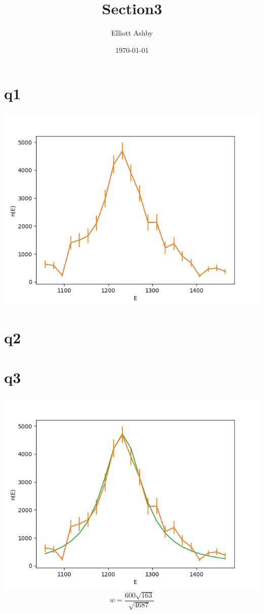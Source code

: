 \documentclass[a4paper,english]{article}
\title{Section3}
\author{Elliott Ashby}
\date{\today}
\begin{document}
    \maketitle
    \section{q1}
    \includegraphics[scale=0.8]{./q3_1.png}
    \section{q2}
    \section{q3}
    \includegraphics[scale=0.8]{./q3_1th.png}
        \begin{equation}
            w = \frac{600\sqrt{163}}{\sqrt{4687}}
        \end{equation}
\end{document}
